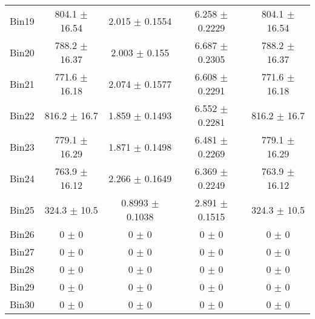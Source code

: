 \begin{tabular}{@{\extracolsep{4pt}}lcccc@{}}
     Bin19 & 804.1 $\pm$ 16.54 & 2.015 $\pm$ 0.1554 & 6.258 $\pm$ 0.2229 & 804.1 $\pm$ 16.54 \\ 
     Bin20 & 788.2 $\pm$ 16.37 & 2.003 $\pm$ 0.155 & 6.687 $\pm$ 0.2305 & 788.2 $\pm$ 16.37 \\ 
     Bin21 & 771.6 $\pm$ 16.18 & 2.074 $\pm$ 0.1577 & 6.608 $\pm$ 0.2291 & 771.6 $\pm$ 16.18 \\ 
     Bin22 & 816.2 $\pm$ 16.7 & 1.859 $\pm$ 0.1493 & 6.552 $\pm$ 0.2281 & 816.2 $\pm$ 16.7 \\ 
     Bin23 & 779.1 $\pm$ 16.29 & 1.871 $\pm$ 0.1498 & 6.481 $\pm$ 0.2269 & 779.1 $\pm$ 16.29 \\ 
     Bin24 & 763.9 $\pm$ 16.12 & 2.266 $\pm$ 0.1649 & 6.369 $\pm$ 0.2249 & 763.9 $\pm$ 16.12 \\ 
     Bin25 & 324.3 $\pm$ 10.5 & 0.8993 $\pm$ 0.1038 & 2.891 $\pm$ 0.1515 & 324.3 $\pm$ 10.5 \\ 
     Bin26 & 0 $\pm$ 0 & 0 $\pm$ 0 & 0 $\pm$ 0 & 0 $\pm$ 0 \\ 
     Bin27 & 0 $\pm$ 0 & 0 $\pm$ 0 & 0 $\pm$ 0 & 0 $\pm$ 0 \\ 
     Bin28 & 0 $\pm$ 0 & 0 $\pm$ 0 & 0 $\pm$ 0 & 0 $\pm$ 0 \\ 
     Bin29 & 0 $\pm$ 0 & 0 $\pm$ 0 & 0 $\pm$ 0 & 0 $\pm$ 0 \\ 
     Bin30 & 0 $\pm$ 0 & 0 $\pm$ 0 & 0 $\pm$ 0 & 0 $\pm$ 0 \\ 
\hline\hline
  \end{tabular}
